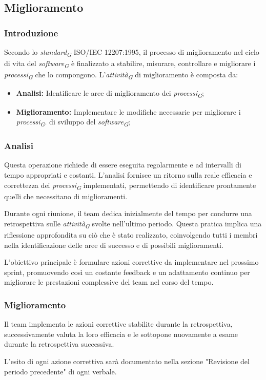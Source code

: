 \subsection{Miglioramento}
\subsubsection{Introduzione}
Secondo lo \textit{standard}\textsubscript{\textit{G}} ISO/IEC 12207:1995, il processo di miglioramento nel ciclo di vita del \textit{software}\textsubscript{\textit{G}} è finalizzato a stabilire, misurare, controllare e migliorare i \textit{processi}\textsubscript{\textit{G}} che lo compongono.
L'\textit{attività}\textsubscript{\textit{G}} di miglioramento è composta da:
 \begin{itemize}
    \item \textbf{Analisi:} Identificare le aree di miglioramento dei \textit{processi}\textsubscript{\textit{G}}; 
    \item  \textbf{Miglioramento:} Implementare le modifiche necessarie per migliorare i \textit{processi}\textsubscript{\textit{G}}. 
    di sviluppo del \textit{software}\textsubscript{\textit{G}};
 \end{itemize}
 \subsubsection{Analisi}
Questa operazione richiede di essere eseguita regolarmente e ad intervalli di tempo appropriati e costanti. L'analisi fornisce un ritorno sulla reale efficacia e correttezza dei \textit{processi}\textsubscript{\textit{G}} implementati, permettendo di identificare prontamente quelli che necessitano di miglioramenti.

\vspace*{0.2cm}

Durante ogni riunione, il team dedica inizialmente del tempo per condurre una retrospettiva sulle \textit{attività}\textsubscript{\textit{G}} svolte nell'ultimo periodo. Questa pratica implica una riflessione approfondita su ciò che è stato realizzato, coinvolgendo tutti i membri nella identificazione delle aree di successo e di possibili miglioramenti. 

L'obiettivo principale è formulare azioni correttive da implementare nel prossimo sprint, promuovendo così un costante feedback e un adattamento continuo per migliorare le prestazioni complessive del team nel corso del tempo. 

\subsubsection{Miglioramento}
Il team implementa le azioni correttive stabilite durante la retrospettiva, successivamente valuta la loro efficacia e le sottopone nuovamente a esame durante la retrospettiva successiva.

L'esito di ogni azione correttiva sarà documentato nella sezione "Revisione del periodo precedente" di ogni verbale. 
